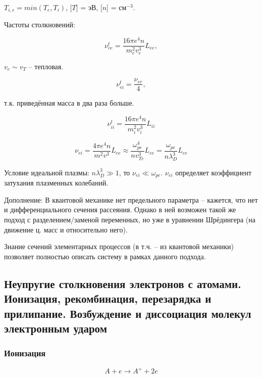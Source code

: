\documentclass[10pt, a4paper]{article}
\numberwithin{equation}{section}
\begin{document}
$T_{i,e} = min(T_e, T_i)$, [$T$] = эВ, [$n$] = см$^{-3}$.

Частоты столкновений:

\begin{equation} \label{eq:freq_ee}
	\nu_{ee}^t = \frac{16\pi e^4 n}{m_e^2v_e^3}L_{ee},
\end{equation}

$v_e\sim v_T$ -- тепловая.

\begin{equation} \label{eq:freq_ei}
	\nu_{ei}^t = \frac{\nu_{ee}}{4},
\end{equation}

т.к. приведённая масса в два раза больше.

\begin{equation} \label{eq:freq_ii}
	\nu_{ii}^t = \frac{16\pi e^4 n}{m_i^2v_i^3}L_{ii}
\end{equation}

\begin{equation*}
	\nu_{ei} = \frac{4\pi e^4 n}{m^2v^3}L_{ee} \approx \frac{\omega_{pe}^4}{nv_{Te}^3}L_{ee} = \frac{\omega_{pe}}{n\lambda_D^3}L_{ee}
\end{equation*}

Условие идеальной плазмы: $n\lambda_D^3 \gg 1$, то $\nu_{ei} \ll \omega_{pe}$. $\nu_{ei}$ определяет коэффициент затухания плазменных колебаний.

Дополнение: В квантовой механике нет предельного параметра -- кажется, что нет и дифференциального сечения рассеяния. Однако в ней возможен такой же подход с разделением/заменой переменных, но уже в уравнении Шрёдингера (на движение ц. масс и относительно него). 

Знание сечений элементарных процессов (в т.ч. -- из квантовой механики) позволяет полностью описать систему в рамках данного подхода.

\subsection{Неупругие столкновения электронов с атомами. Ионизация, рекомбинация, перезарядка и прилипание. Возбуждение и диссоциация молекул электронным ударом}

\subsubsection{Ионизация}

\begin{equation}
	A + e \rightarrow A^{+} + 2e
\end{equation}
\end{document}
